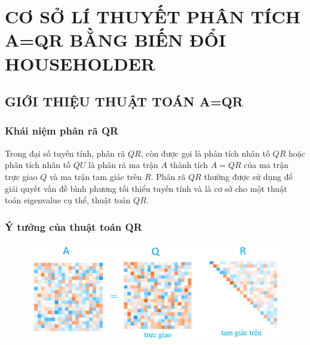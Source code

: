 \section{CƠ SỞ LÍ THUYẾT PHÂN TÍCH A=QR BẰNG BIẾN ĐỔI HOUSEHOLDER}
\subsection{GIỚI THIỆU THUẬT TOÁN A=QR}
\subsubsection{Khái niệm phân rã QR} Trong đại số tuyến tính, phân rã $QR$, còn được gọi là phân
tích nhân tố $QR$ hoặc phân tích nhân tố $QU$ là phân rã ma trận $A$ thành tích $A = QR$
của ma trận trực giao $Q$ và ma trận tam giác trên $R$. Phân rã $QR$ thường được sử dụng
để giải quyết vấn đề bình phương tối thiểu tuyến tính và là cơ sở cho một thuật toán
eigenvalue cụ thể, thuật toán $QR$.

\subsubsection{Ý tưởng của thuật toán QR}
\begin{figure}[!ht]
	\centering
	\includegraphics[scale=0.4]{ytuong}
\end{figure}

